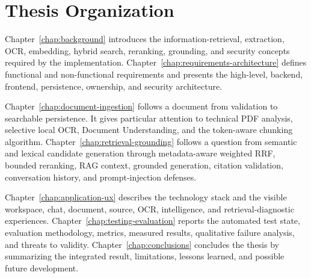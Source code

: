 \section{Thesis Organization}
\label{sec:introduction-organization}

Chapter~\ref{chap:background} introduces the information-retrieval, extraction, OCR, embedding, hybrid search, reranking, grounding, and security concepts required by the implementation. Chapter~\ref{chap:requirements-architecture} defines functional and non-functional requirements and presents the high-level, backend, frontend, persistence, ownership, and security architecture.

Chapter~\ref{chap:document-ingestion} follows a document from validation to searchable persistence. It gives particular attention to technical PDF analysis, selective local OCR, Document Understanding, and the token-aware chunking algorithm. Chapter~\ref{chap:retrieval-grounding} follows a question from semantic and lexical candidate generation through metadata-aware weighted RRF, bounded reranking, RAG context, grounded generation, citation validation, conversation history, and prompt-injection defenses.

Chapter~\ref{chap:application-ux} describes the technology stack and the visible workspace, chat, document, source, OCR, intelligence, and retrieval-diagnostic experiences. Chapter~\ref{chap:testing-evaluation} reports the automated test state, evaluation methodology, metrics, measured results, qualitative failure analysis, and threats to validity. Chapter~\ref{chap:conclusions} concludes the thesis by summarizing the integrated result, limitations, lessons learned, and possible future development.
